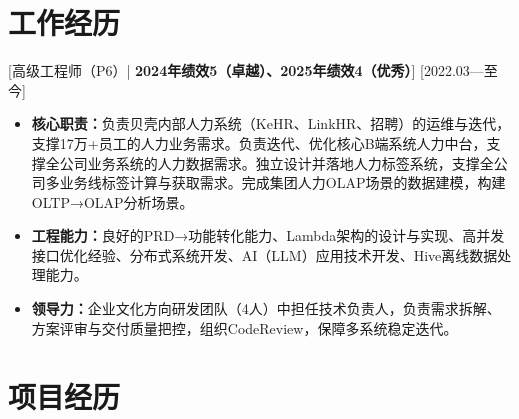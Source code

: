 \documentclass{resume}
\begin{document}


\ResumeTitle

\section{工作经历}
[\textnormal{高级工程师（P6）|\textbf{ 2024年绩效5（卓越）、2025年绩效4（优秀）}}]
[2022.03—至今]
\begin{itemize}
  \item \textbf{核心职责：}负责贝壳内部人力系统（KeHR、LinkHR、招聘）的运维与迭代，支撑17万+员工的人力业务需求。负责迭代、优化核心B端系统人力中台，支撑全公司业务系统的人力数据需求。独立设计并落地人力标签系统，支撑全公司多业务线标签计算与获取需求。完成集团人力OLAP场景的数据建模，构建OLTP→OLAP分析场景。
  \item \textbf{工程能力：}良好的PRD→功能转化能力、Lambda架构的设计与实现、高并发接口优化经验、分布式系统开发、AI（LLM）应用技术开发、Hive离线数据处理能力。
  \item \textbf{领导力：}企业文化方向研发团队（4人）中担任技术负责人，负责需求拆解、方案评审与交付质量把控，组织CodeReview，保障多系统稳定迭代。
\end{itemize}

\section{项目经历}
\end{document}
